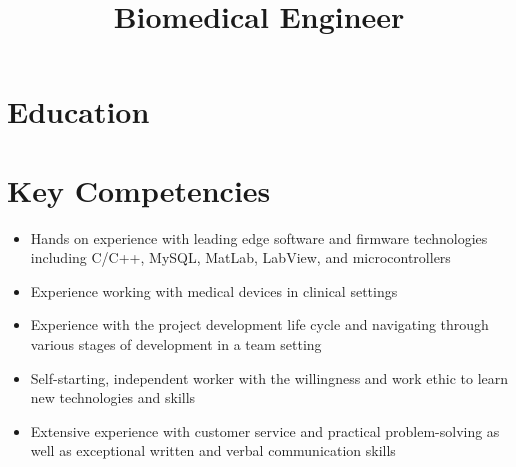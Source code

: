 \documentclass[11pt,a4paper,sans]{moderncv}        %
\title{Biomedical Engineer}                               %
\begin{document}
\makecvtitle

\section{Education}

\section{Key Competencies}
\begin{itemize}%
	\item Hands on experience with leading edge software and firmware technologies including C/C++, MySQL, MatLab, LabView, and microcontrollers
	\item Experience working with medical devices in clinical settings
	\item Experience with the project development life cycle and navigating through various stages of development in a team setting
	\item Self-starting, independent worker with the willingness and work ethic to learn new technologies and skills
	\item Extensive experience with customer service and practical problem-solving as well as exceptional written and verbal communication skills
\end{itemize}
\end{document}

